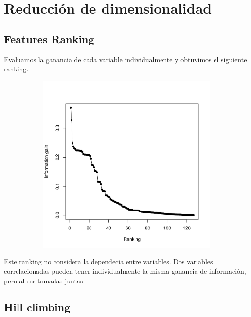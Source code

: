 \documentclass[a4paper,10pt]{article}
\begin{document}
\section{Reducci\'on de dimensionalidad} \label{sec:seleccion}

\subsection{Features Ranking}

Evaluamos la ganancia de cada variable individualmente y obtuvimos el siguiente ranking. 

  \begin{figure}[H]
    \centering
    \begin{subfigure}[b]{0.4\textwidth}
      \includegraphics[width=\textwidth]{../imagenes/features_ranking}
      \caption{}
    \end{subfigure}
    \label{fig:features_ranking}
  \end{figure}

Este ranking no considera la dependecia entre variables. Dos variables correlacionadas pueden tener individualmente la misma ganancia de informaci\'on, pero al ser tomadas juntas

\subsection{Hill climbing}
\end{document}
